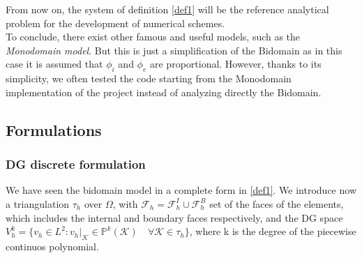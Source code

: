 \documentclass[a4paper,12pt]{article}
\begin{document}
    \vspace{4mm}
    \noindent From now on, the system of definition \ref{def1} will be the reference analytical problem for the development of numerical schemes.\\
    To conclude, there exist other famous and useful models, such as the \emph{Monodomain model}. But this is just a simplification of the Bidomain as in this case it is assumed that $\phi_i$ and $\phi_e$ are proportional. However, thanks to its simplicity, we often tested the code starting from the Monodomain implementation of the project \cite{andreotti} instead of analyzing directly the Bidomain.

    \subsection{Formulations}
    \subsubsection{DG discrete formulation}
    We have seen the bidomain model in a complete form in \ref{def1}. We introduce now a triangulation $\tau_h$ over $\Omega$, with $\mathcal{F} _h=\mathcal{F} _h^I \cup \mathcal{F} _h^B$ set of the faces of the elements, which includes the internal and boundary faces respectively, and the DG space $V_h^k = \{v_h \in L^2 : v_h|_\mathcal{K} \in \mathbb{P}^{k}(\mathcal{K})  \quad \forall \mathcal{K} \in \tau_h \}$, where k is the degree of the piecewise continuos polynomial.
    
\end{document}
